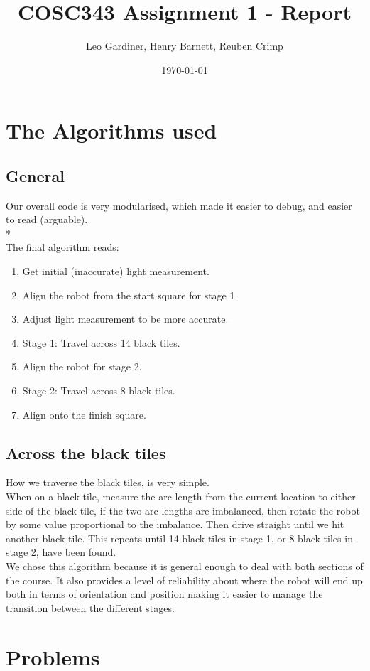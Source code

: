 \documentclass[a4paper,11pt]{article}
\title{COSC343 Assignment 1 - Report}
\author{Leo Gardiner, Henry Barnett, Reuben Crimp}
\date{\today}
\begin{document}
\maketitle
\section {The Algorithms used}

\subsection{General}
Our overall code is very modularised, which made it easier to debug, and easier to read (arguable).
\\*\\The final algorithm reads:
\begin{enumerate}
\item Get initial (inaccurate) light measurement.
\item Align the robot from the start square for stage 1.
\item Adjust light measurement to be more accurate.
\item Stage 1: Travel across 14 black tiles.
\item Align the robot for stage 2.
\item Stage 2: Travel across 8 black tiles.
\item Align onto the finish square.
\end{enumerate}

\subsection{Across the black tiles}
How we traverse the black tiles, is very simple.
\\When on a black tile, measure the arc length from the current location to either side of the black tile, if the two arc lengths are imbalanced, then rotate the robot by some value proportional to the imbalance.
Then drive straight until we hit another black tile. This repeats until 14 black tiles in stage 1, or 8 black tiles in stage 2, have been found.
\\We chose this algorithm because it is general enough to deal with both sections of the course. It also provides a level of reliability about where the robot will end up both in terms of orientation and position making it easier to manage the transition between the different stages.
\clearpage
\section {Problems}
\end{document}
